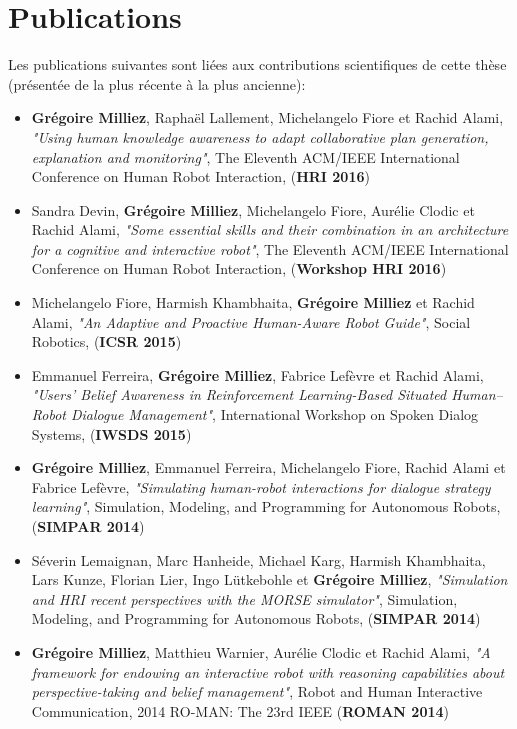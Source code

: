 \documentclass[a4paper,11pt,twoside]{StyleThese}
\begin{document}
\section{Publications}

Les publications suivantes sont liées aux contributions scientifiques de cette thèse (présentée de la plus récente à la plus ancienne):

\begin{itemize}
\item \textbf{Grégoire Milliez}, Raphaël Lallement, Michelangelo Fiore et Rachid Alami, \textit{"Using human knowledge awareness to adapt collaborative plan generation, explanation and monitoring"}, The Eleventh ACM/IEEE International Conference on Human Robot Interaction, (\textbf{HRI 2016})
\item Sandra Devin, \textbf{Grégoire Milliez}, Michelangelo Fiore, Aurélie Clodic et Rachid Alami, \textit{"Some essential skills and their combination in an architecture for a cognitive and interactive robot"}, The Eleventh ACM/IEEE International Conference on Human Robot Interaction, (\textbf{Workshop HRI 2016})
\item Michelangelo Fiore, Harmish Khambhaita, \textbf{Grégoire Milliez} et Rachid Alami, \textit{"An Adaptive and Proactive Human-Aware Robot Guide"}, Social Robotics, (\textbf{ICSR 2015})
\item Emmanuel Ferreira, \textbf{Grégoire Milliez}, Fabrice Lefèvre et Rachid Alami, \textit{"Users’ Belief Awareness in Reinforcement Learning-Based Situated Human–Robot Dialogue Management"}, International Workshop on Spoken Dialog Systems, (\textbf{IWSDS 2015})
\item \textbf{Grégoire Milliez}, Emmanuel Ferreira, Michelangelo Fiore, Rachid Alami et Fabrice Lefèvre, \textit{"Simulating human-robot interactions for dialogue strategy learning"}, Simulation, Modeling, and Programming for Autonomous Robots, (\textbf{SIMPAR 2014})
\item Séverin Lemaignan, Marc Hanheide, Michael Karg, Harmish Khambhaita, Lars Kunze, Florian Lier, Ingo Lütkebohle et \textbf{Grégoire Milliez}, \textit{"Simulation and HRI recent perspectives with the MORSE simulator"}, Simulation, Modeling, and Programming for Autonomous Robots, (\textbf{SIMPAR 2014})
\item \textbf{Grégoire Milliez}, Matthieu Warnier, Aurélie Clodic et Rachid Alami, \textit{"A framework for endowing an interactive robot with reasoning capabilities about perspective-taking and belief management"}, Robot and Human Interactive Communication, 2014 RO-MAN: The 23rd IEEE (\textbf{ROMAN 2014})
\end{itemize}
\end{document}
